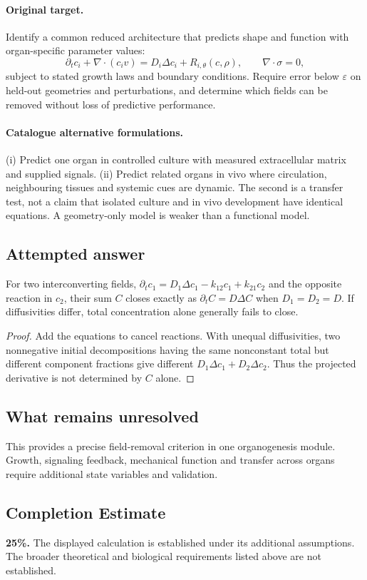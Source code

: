 \documentclass[11pt]{article}
\begin{document}
\paragraph{Original target.}
Identify a common reduced architecture that predicts shape and function with organ-specific parameter values:
\[
\partial_t c_i+\nabla\!\cdot(c_iv)=D_i\Delta c_i+R_{i,\theta}(c,\rho),
\qquad
\nabla\!\cdot\sigma=0,
\]
subject to stated growth laws and boundary conditions. Require error below $\varepsilon$ on held-out geometries and perturbations, and determine which fields can be removed without loss of predictive performance.
\paragraph{Catalogue alternative formulations.}
(i) Predict one organ in controlled culture with measured extracellular matrix and supplied signals. (ii) Predict related organs in vivo where circulation, neighbouring tissues and systemic cues are dynamic. The second is a transfer test, not a claim that isolated culture and in vivo development have identical equations. A geometry-only model is weaker than a functional model.
\subsection{Attempted answer}
\begin{proposition}
For two interconverting fields, $\partial_tc_1=D_1\Delta c_1-k_{12}c_1+k_{21}c_2$ and the opposite reaction in $c_2$, their sum $C$ closes exactly as $\partial_tC=D\Delta C$ when $D_1=D_2=D$. If diffusivities differ, total concentration alone generally fails to close.
\end{proposition}
\begin{proof}
Add the equations to cancel reactions. With unequal diffusivities, two nonnegative initial decompositions having the same nonconstant total but different component fractions give different $D_1\Delta c_1+D_2\Delta c_2$. Thus the projected derivative is not determined by $C$ alone.
\end{proof}
\subsection{What remains unresolved}
This provides a precise field-removal criterion in one organogenesis module. Growth, signaling feedback, mechanical function and transfer across organs require additional state variables and validation.
\subsection{Completion Estimate}
\textbf{25\%.} The displayed calculation is established under its additional assumptions. The broader theoretical and biological requirements listed above are not established.
\end{document}
